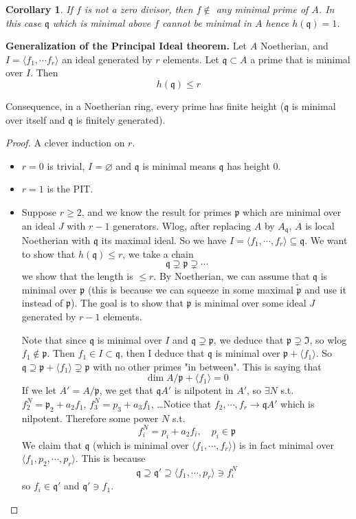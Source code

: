 \documentclass[11pt,a4paper]{article}
\theoremstyle{definition}
\theoremstyle{plain}
\newtheorem{corollary}[definition]{Corollary}
\theoremstyle{remark}
\newcommand{\angles}[1]{\langle #1 \rangle}
\begin{document}
\begin{corollary}
    If $f$ is not a zero divisor, then $f \not\in $ any minimal prime of $A$. In this case $\mathfrak{q}$ which is minimal above $f$ cannot be minimal in $A$ hence 
    $h(\mathfrak{q}) = 1$.  
\end{corollary}

\textbf{Generalization of the Principal Ideal theorem.} Let $A$ Noetherian, and $I = \angles{f_1, \cdots f_r}$ an ideal generated by $r$ elements. 
Let $\mathfrak{q} \subset A$ a prime that is minimal over $I$. Then 
$$h(\mathfrak{q}) \le r$$

Consequence, in a Noetherian ring, every prime has finite height ($\mathfrak{q}$ is minimal over itself and $\mathfrak{q}$ is finitely generated).

\begin{proof}
    A clever induction on $r$. 
    \begin{itemize}
        \item $r= 0$ is trivial, $I = \varnothing$ and $\mathfrak{q}$ is minimal means $\mathfrak{q}$ has height $0$. 
        \item $r=1$ is the PIT. 
        \item Suppose $r \ge 2$, and we know the result for primes $\mathfrak{p}$ which are minimal over an ideal $J$ with $r-1$ generators. 
        Wlog, after replacing $A$ by $A_\mathfrak{q}$, $A$ is local Noetherian with $\mathfrak{q}$ its maximal ideal. So we have 
        $I = \angles{f_1, \cdots, f_r} \subseteq \mathfrak{q}$. We want to show that $h(\mathfrak{q}) \le r$, we take a chain 
        $$\mathfrak{q} \supsetneq \mathfrak{p} \supsetneq \cdots$$
        we show that the length is $\le r$. By Noetherian, we can assume that $\mathfrak{q}$ is minimal over $\mathfrak{p}$ (this is because we can 
        squeeze in some maximal $\tilde{\mathfrak{p}}$ and use it instead of $\mathfrak{p}$). The goal is to show that $\mathfrak{p}$ is minimal over some 
        ideal $J$ generated by $r-1$ elements. 
        
        Note that since $\mathfrak{q}$ is minimal over $I$ and $\mathfrak{q} \supsetneq \mathfrak{p}$, we deduce that $\mathfrak{p} \supsetneq \mathfrak{I}$, 
        so wlog $f_1 \not\in \mathfrak{p}$. Then $f_1 \in I \subset \mathfrak{q}$, then I deduce that $\mathfrak{q}$ is minimal over $\mathfrak{p} + \angles{f_1}$. 
        So $\mathfrak{q} \supseteq \mathfrak{p} + \angles{f_1} \supsetneq \mathfrak{p}$ with no other primes "in between". This is saying that 
        $$\dim A/\mathfrak{p} + \angles{f_1} = 0$$
        If we let $A' = A/\mathfrak{p}$, we get that $\mathfrak{q}A'$ is nilpotent in $A'$, so $\exists N$ s.t. $f_2^N = \mathfrak{p}_2 + a_2 f_1 $, 
        $f_3^N = p_3 + a_3 f_1$, \dots Notice that $f_2, \cdots, f_r \to \mathfrak{q} A'$ which is nilpotent. 
        Therefore some power $N$ s.t. 
        $$f_i^N = p_i + a_2 f_i, \quad p_i \in \mathfrak{p}$$
        We claim that $\mathfrak{q}$ (which is minimal over $\angles{f_1, \cdots, f_r}$) is in fact minimal over 
        $\angles{f_1, p_2, \cdots, p_r}$. This is because 
        $$\mathfrak{q} \supseteq \mathfrak{q}' \supseteq \angles{f_1, \cdots, p_r} \ni f_i^N$$
        so $f_i \in \mathfrak{q}'$ and $\mathfrak{q}' \ni f_1$.
        

\end{itemize}
\end{proof}
\end{document}
